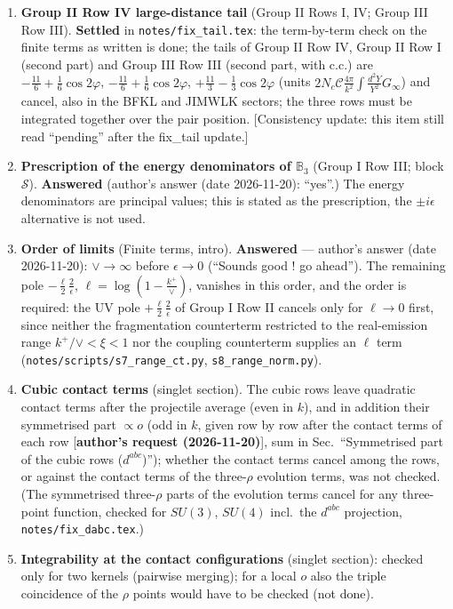 \documentclass[9pt]{article}
\def\mf#1{\mathbb{#1}}
\numberwithin{equation}{section}
\begin{document}
{\begin{enumerate}
\item \textbf{Group II Row IV large-distance tail} (Group II Rows I, IV; Group III Row III). \textbf{Settled} in \texttt{notes/fix\_tail.tex}: the term-by-term check on the finite terms as written is done; the tails of Group II Row IV, Group II Row I (second part) and Group III Row III (second part, with c.c.) are $-\frac{11}{6}+\frac16\cos2\varphi$, $-\frac{11}{6}+\frac16\cos2\varphi$, $+\frac{11}{3}-\frac13\cos2\varphi$ (units $2N_{c}\mathcal{C}\frac{4\pi}{k^{2}}\int\frac{d^{2}Y}{Y^{2}}G_{\infty}$) and cancel, also in the BFKL and JIMWLK sectors; the three rows must be integrated together over the pair position. [Consistency update: this item still read ``pending'' after the fix\_tail update.]
\item \textbf{Prescription of the energy denominators of $\mf{B}_{3}$} (Group I Row III; block $\mathcal{S}$). \textbf{Answered} (author's answer (date 2026-11-20): ``yes''.) The energy denominators are principal values; this is stated as the prescription, the $\pm i\epsilon$ alternative is not used.
\item \textbf{Order of limits} (Finite terms, intro). \textbf{Answered} --- author's answer (date 2026-11-20): $\vee\to\infty$ before $\epsilon\to0$ (``Sounds good ! go ahead''). The remaining pole $-\frac{\ell}{2}\frac{2}{\epsilon}$, $\ell=\log(1-\frac{k^{+}}{\vee})$, vanishes in this order, and the order is required: the UV pole $+\frac{\ell}{2}\frac{2}{\epsilon}$ of Group I Row II cancels only for $\ell\to0$ first, since neither the fragmentation counterterm restricted to the real-emission range $k^{+}/\vee<\xi<1$ nor the coupling counterterm supplies an $\ell$ term (\texttt{notes/scripts/s7\_range\_ct.py}, \texttt{s8\_range\_norm.py}).
\item \textbf{Cubic contact terms} (singlet section). The cubic rows leave quadratic contact terms after the projectile average (even in $k$), and in addition their symmetrised part $\propto o$ (odd in $k$, given row by row after the contact terms of each row [\textbf{author's request (2026-11-20)}], sum in Sec.~``Symmetrised part of the cubic rows ($d^{abc}$)''); whether the contact terms cancel among the rows, or against the contact terms of the three-$\rho$ evolution terms, was not checked. (The symmetrised three-$\rho$ parts of the evolution terms cancel for any three-point function, checked for $SU(3)$, $SU(4)$ incl.\ the $d^{abc}$ projection, \texttt{notes/fix\_dabc.tex}.)
\item \textbf{Integrability at the contact configurations} (singlet section): checked only for two kernels (pairwise merging); for a local $o$ also the triple coincidence of the $\rho$ points would have to be checked (not done).

\end{enumerate}}
\end{document}
